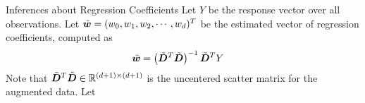 \ifdefined\wox \begin{frame} \titlepage \end{frame} \fi

%
\begin{frame}{Inferences about Regression Coefficients}
Let $Y$ be the response vector over all observations.
Let $\tilde{{\boldsymbol w}} = (w_0, w_1, w_2, \cdots, w_d)^T$ be the estimated vector of 
regression coefficients, computed as 
\begin{align*}
    \tilde{{\boldsymbol w}} & = \left(\tilde{{\boldsymbol D}}^T\tilde{{\boldsymbol D}}\right)^{-1} \tilde{{\boldsymbol D}}^T Y
\end{align*}
%
%
%
Note that $\tilde{{\boldsymbol D}}^T\tilde{{\boldsymbol D}} \in {\mathord{\mathbb R}}^{(d+1) \times (d+1)}$ is the uncentered scatter matrix for the augmented data. Let

\end{frame}
